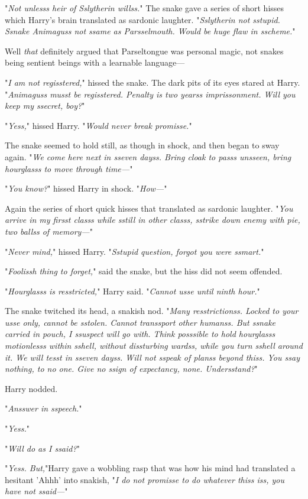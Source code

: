 "\emph{Not unlesss heir of Sslytherin willss.}" The snake gave a series of 
short hisses which Harry's brain translated as sardonic laughter. 
"\emph{Sslytherin not sstupid. Ssnake Animaguss not ssame as Parsselmouth. 
Would be huge flaw in sscheme.}"

Well \emph{that} definitely argued that Parseltongue was personal magic, not 
snakes being sentient beings with a learnable language---

"\emph{I am not regisstered,}" hissed the snake. The dark pits of its eyes 
stared at Harry. "\emph{Animaguss musst be regisstered. Penalty is two yearss 
imprissonment. Will you keep my ssecret, boy?}"

"\emph{Yess,}" hissed Harry. "\emph{Would never break promisse.}"

The snake seemed to hold still, as though in shock, and then began to sway 
again. "\emph{We come here next in sseven dayss. Bring cloak to passs unsseen, 
bring hourglasss to move through time---}"

"\emph{You know?}" hissed Harry in shock. "\emph{How---}"

Again the series of short quick hisses that translated as sardonic laughter. 
"\emph{You arrive in my firsst classs while sstill in other classs, sstrike 
down enemy with pie, two ballss of memory---}"

"\emph{Never mind,}" hissed Harry. "\emph{Sstupid question, forgot you were 
ssmart.}"

"\emph{Foolissh thing to forget,}" said the snake, but the hiss did not seem 
offended.

"\emph{Hourglasss is resstricted,}" Harry said. "\emph{Cannot usse until ninth 
hour.}"

The snake twitched its head, a snakish nod. "\emph{Many resstrictionss. Locked 
to your usse only, cannot be sstolen. Cannot transsport other humanss. But 
ssnake carried in pouch, I ssuspect will go with. Think posssible to hold 
hourglasss motionlesss within sshell, without dissturbing wardss, while you 
turn sshell around it. We will tesst in sseven dayss. Will not sspeak of planss 
beyond thiss. You ssay nothing, to no one. Give no ssign of expectancy, none. 
Undersstand?}"

Harry nodded.

"\emph{Ansswer in sspeech.}"

"\emph{Yess.}"

"\emph{Will do as I ssaid?}"

"\emph{Yess. But,}"Harry gave a wobbling rasp that was how his mind had 
translated a hesitant 'Ahhh' into snakish, "\emph{I do not promisse to do 
whatever thiss iss, you have not ssaid---}"

